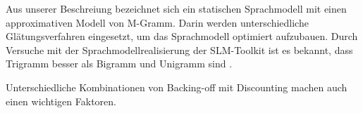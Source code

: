 Aus unserer Beschreiung bezeichnet sich ein statischen Sprachmodell mit einen approximativen Modell von M-Gramm. Darin werden unterschiedliche Gl\"atungsverfahren eingesetzt, um das Sprachmodell optimiert aufzubauen.
Durch Versuche mit der Sprachmodellrealisierung der SLM-Toolkit ist es bekannt, dass Trigramm besser als Bigramm und Unigramm sind .

Unterschiedliche Kombinationen von Backing-off mit Discounting machen auch einen wichtigen Faktoren.
